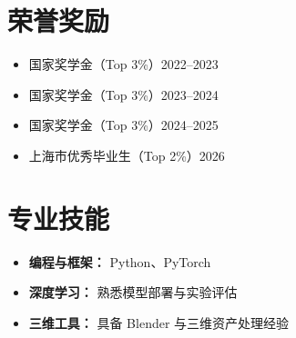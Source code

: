 \documentclass[a4paper,11pt]{article}
\newcommand{\resumeSubHeadingListStart}{\begin{itemize}[leftmargin=0.15in,label={},topsep=2pt,itemsep=2pt,parsep=0pt]}
\newcommand{\resumeSubHeadingListEnd}{\end{itemize}}
\begin{document}
\section{荣誉奖励}
\resumeSubHeadingListStart
\item\small 国家奖学金（Top 3\%）\hfill 2022--2023
\item\small 国家奖学金（Top 3\%）\hfill 2023--2024
\item\small 国家奖学金（Top 3\%）\hfill 2024--2025
\item\small 上海市优秀毕业生（Top 2\%）\hfill 2026
\resumeSubHeadingListEnd

\section{专业技能}
\begin{itemize}[leftmargin=0.15in,label={},itemsep=1pt]
\item\small\textbf{编程与框架：} Python、PyTorch
\item\small\textbf{深度学习：} 熟悉模型部署与实验评估
\item\small\textbf{三维工具：} 具备 Blender 与三维资产处理经验
\end{itemize}
\end{document}
